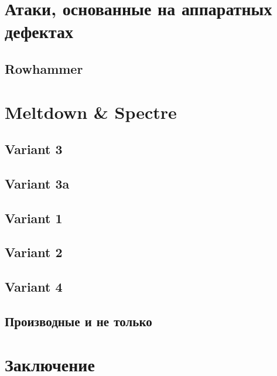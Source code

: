 \documentclass[final, xcolor = table, usenames, dvipsnames, table, aspectratio = 169]{beamer}
\begin{document}

\section{Атаки, основанные на аппаратных дефектах}


\subsection{Rowhammer}



\section{Meltdown \& Spectre}
\subsection{Variant 3}


\subsection{Variant 3a}


\subsection{Variant 1}


\subsection{Variant 2}


\subsection{Variant 4}


\subsection{Производные и не только}



\section{Заключение}

\end{document}
